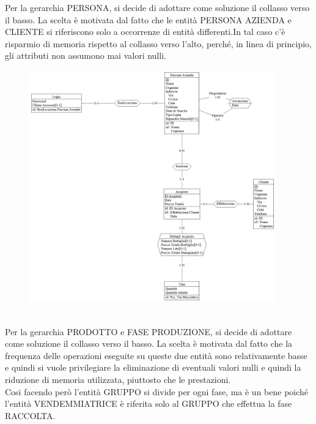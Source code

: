 \documentclass{article}
\begin{document}
\begin{itemize}
Per la gerarchia PERSONA, si decide di adottare come soluzione il collasso verso il basso. La scelta è motivata dal fatto che le entità PERSONA AZIENDA e CLIENTE si riferiscono solo a occorrenze di entità differenti.In tal caso c'è risparmio di memoria rispetto al collasso verso l'alto, perché, in linea di principio, gli attributi non assumono mai valori nulli.\\
\begin{figure}[htbp]
\centering
\includegraphics[width=0.95\textwidth]{img/eliminazione_ger_Persona.png}
\end{figure}\\\newline\newline
\newpage
Per la gerarchia PRODOTTO e FASE PRODUZIONE, si decide di adottare come soluzione il collasso verso il basso. La scelta è motivata dal fatto che la frequenza delle operazioni eseguite su queste due entità sono relativamente basse e quindi si vuole privilegiare la  eliminazione di eventuali valori nulli e quindi la riduzione di memoria utilizzata, piuttosto che le prestazioni.\\
Cosi facendo però l'entità GRUPPO si divide per ogni fase, ma è un bene poiché l'entità VENDEMMIATRICE è riferita solo al GRUPPO che effettua la fase RACCOLTA.\newline
\newline
\begin{figure}[htbp]
\centering

\end{figure}
\end{itemize}
\end{document}
